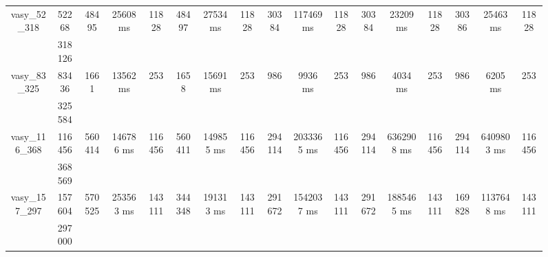 \documentclass[../master/master.tex]{subfiles}
\begin{document}
\begin{figure}
\begin{adjustbox}{angle=90}
\begin{tabular}{ |c|c||c|c|c||c|c|c||c|c|c||c|c|c||c|c|c|| }
\hline
\multirow{2}{3.6em}{vasy\_52\_318} & 52268 & \multirow{2}{3.6em}{48495} & \multirow{2}{3.6em}{25608 ms} & \multirow{2}{3.6em}{11828} & \multirow{2}{3.6em}{48497} & \multirow{2}{3.6em}{27534 ms} & \multirow{2}{3.6em}{11828} & \multirow{2}{3.6em}{30384} & \multirow{2}{3.6em}{117469 ms} & \multirow{2}{3.6em}{11828} & \multirow{2}{3.6em}{30384} & \multirow{2}{3.6em}{23209 ms} & \multirow{2}{3.6em}{11828} & \multirow{2}{3.6em}{30386} & \multirow{2}{3.6em}{25463 ms} & \multirow{2}{3.6em}{11828} \\
\cline{2-2}
 & 318126  &  &  &  &  &  &  &  &  &  &  &  &  &  &  &  \\
\hline
\multirow{2}{3.6em}{vasy\_83\_325} & 83436 & \multirow{2}{3.6em}{1661} & \multirow{2}{3.6em}{13562 ms} & \multirow{2}{3.6em}{253} & \multirow{2}{3.6em}{1658} & \multirow{2}{3.6em}{15691 ms} & \multirow{2}{3.6em}{253} & \multirow{2}{3.6em}{986} & \multirow{2}{3.6em}{9936 ms} & \multirow{2}{3.6em}{253} & \multirow{2}{3.6em}{986} & \multirow{2}{3.6em}{4034 ms} & \multirow{2}{3.6em}{253} & \multirow{2}{3.6em}{986} & \multirow{2}{3.6em}{6205 ms} & \multirow{2}{3.6em}{253} \\
\cline{2-2}
 & 325584  &  &  &  &  &  &  &  &  &  &  &  &  &  &  &  \\
\hline
\multirow{2}{3.6em}{vasy\_116\_368} & 116456 & \multirow{2}{3.6em}{560414} & \multirow{2}{3.6em}{146786 ms} & \multirow{2}{3.6em}{116456} & \multirow{2}{3.6em}{560411} & \multirow{2}{3.6em}{149855 ms} & \multirow{2}{3.6em}{116456} & \multirow{2}{3.6em}{294114} & \multirow{2}{3.6em}{2033365 ms} & \multirow{2}{3.6em}{116456} & \multirow{2}{3.6em}{294114} & \multirow{2}{3.6em}{6362908 ms} & \multirow{2}{3.6em}{116456} & \multirow{2}{3.6em}{294114} & \multirow{2}{3.6em}{6409803 ms} & \multirow{2}{3.6em}{116456} \\
\cline{2-2}
 & 368569  &  &  &  &  &  &  &  &  &  &  &  &  &  &  &  \\
\hline
\multirow{2}{3.6em}{vasy\_157\_297} & 157604 & \multirow{2}{3.6em}{570525} & \multirow{2}{3.6em}{253563 ms} & \multirow{2}{3.6em}{143111} & \multirow{2}{3.6em}{344348} & \multirow{2}{3.6em}{191313 ms} & \multirow{2}{3.6em}{143111} & \multirow{2}{3.6em}{291672} & \multirow{2}{3.6em}{1542037 ms} & \multirow{2}{3.6em}{143111} & \multirow{2}{3.6em}{291672} & \multirow{2}{3.6em}{1885465 ms} & \multirow{2}{3.6em}{143111} & \multirow{2}{3.6em}{169828} & \multirow{2}{3.6em}{1137648 ms} & \multirow{2}{3.6em}{143111} \\
\cline{2-2}
 & 297000  &  &  &  &  &  &  &  &  &  &  &  &  &  &  &  \\

\end{tabular}
\end{adjustbox}
\end{figure}
\end{document}
